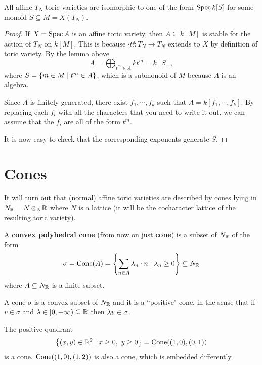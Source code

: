 \begin{theorem}[]\label{ThAffineToricVarietiesComeFromAffineMonoids}
All affine $T_N$-toric varieties are isomorphic to one of the form $\operatorname{Spec} k[S]$ for some monoid $S\subseteq M=X(T_N)$.
\end{theorem}
\begin{proof}
If $X=\operatorname{Spec} A$ is an affine toric variety, then $A\subseteq k[M]$ is stable for the action of $T_N$ on $k[M]$. This is because $\cdot t\ii:T_N\to T_N$ extends to $X$ by definition of toric variety.
By the lemma above
\[A=\bigoplus_{t^m\in A}k t^m=k[S],\]
where $S=\left\{{m\in M\mid t^m\in A}\right\}$, which is a submonoid of $M$ because $A$ is an algebra.

Since $A$ is finitely generated, there exist $f_1,\cdots, f_k$ such that $A=k[f_1,\cdots, f_k]$. By replacing each $f_i$ with all the characters that you need to write it out, we can assume that the $f_i$ are all of the form $t^m$.

It is now easy to check that the corresponding exponents generate $S$.
\end{proof}



\section{Cones}
It will turn out that (normal) affine toric varieties are described by cones lying in $N_{\mathbb{R}}=N\otimes_{\mathbb{Z}}\mathbb{R}$ where $N$ is a lattice (it will be the cocharacter lattice of the resulting toric variety).

\begin{definition}[]
A \textbf{convex polyhedral cone} (from now on just \textbf{cone}) is a subset of $N_{\mathbb{R}}$ of the form
\[\sigma=\mathrm{Cone}(A)=\left\{{\sum_{n\in A}\lambda_n\cdot n\mid \lambda_n\geq 0}\right\}\subseteq N_{\mathbb{R}}\]
where $A\subseteq N_{\mathbb{R}}$ is a finite subset.
\end{definition}

\begin{remark}
A cone $\sigma$ is a convex subset of $N_{\mathbb{R}}$ and it is a ``positive" cone, in the sense that if $v\in \sigma$ and $\lambda\in [0,+\infty)\subseteq \mathbb{R}$ then $\lambda v\in \sigma$.
\end{remark}

\begin{example}
The positive quadrant 
\[\left\{{(x,y)\in \mathbb{R}^2\mid x\geq 0,\ y\geq 0}\right\}=\mathrm{Cone}((1,0),(0,1))\] 
is a cone.
$\mathrm{Cone}((1,0),(1,2))$ is also a cone, which is embedded differently.
\end{example}


